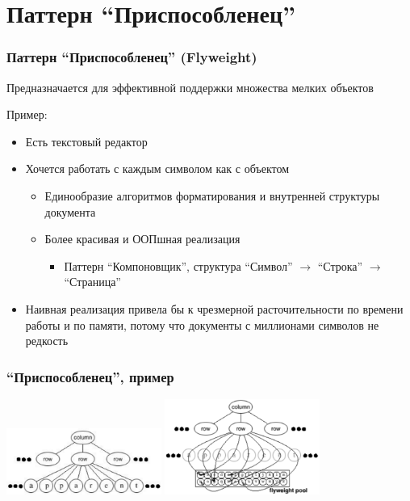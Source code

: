 \documentclass{../cscslides}
\begin{document}
    \section{Паттерн ``Приспособленец''}

    \begin{frame}
        \frametitle{Паттерн ``Приспособленец'' (Flyweight)}
        Предназначается для эффективной поддержки множества мелких объектов

        Пример:

        \begin{itemize}
            \item Есть текстовый редактор
            \item Хочется работать с каждым символом как с объектом
            \begin{itemize}
                \item Единообразие алгоритмов форматирования и внутренней структуры документа
                \item Более красивая и ООПшная реализация
                \begin{itemize}
                    \item Паттерн ``Компоновщик'', структура ``Символ'' $\rightarrow$ ``Строка'' $\rightarrow$ ``Страница''
                \end{itemize}
            \end{itemize}
            \item Наивная реализация привела бы к чрезмерной расточительности по времени работы и по памяти, потому что документы с миллионами символов не редкость
        \end{itemize}
    \end{frame}

    \begin{frame}
        \frametitle{``Приспособленец'', пример}
        \begin{center}
            \includegraphics[width=0.38\textwidth]{noFlyweight.png}
            \raisebox{0.1\textheight}{\quad\Huge{$\rightarrow$}\quad}
            \includegraphics[width=0.38\textwidth]{flyweightExample.png}
        \end{center}
    \end{frame}
\end{document}
